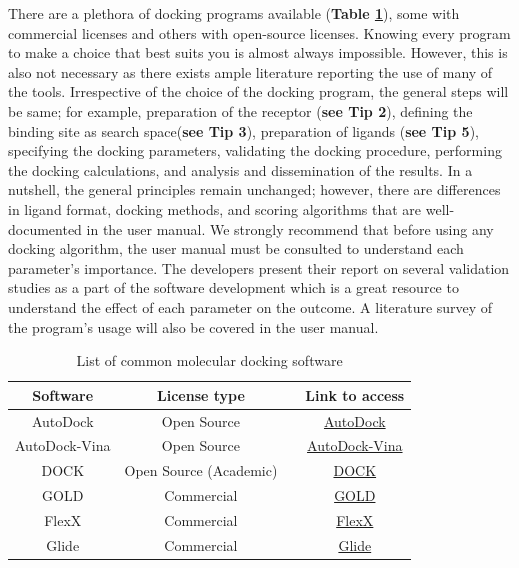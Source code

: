 %
There are a plethora of docking programs available (\textbf{Table \ref{tab:List}}), some with commercial licenses and others with open-source licenses. Knowing every program to make a choice that best suits you is almost always impossible. However, this is also not necessary as there exists ample literature reporting the use of many of the tools. Irrespective of the choice of the docking program, the general steps will be same; for example, preparation of the receptor (\textbf{see  Tip 2}), defining the binding site as search space(\textbf{see Tip 3}), preparation of ligands (\textbf{see Tip 5}), specifying the docking parameters, validating the docking procedure, performing the docking calculations, and analysis and dissemination of the results.  In a nutshell, the general principles remain unchanged; however, there are differences in ligand format, docking methods, and scoring algorithms that are well-documented in the user manual. We strongly recommend that before using any docking algorithm, the user manual must be consulted to understand each parameter's importance. The developers present their report on several validation studies as a part of the software development which is a great resource to understand the effect of each parameter on the outcome. A literature survey of the program's usage will also be covered in the user manual. 

\begin{table}[ht]
    \centering
    \caption{List of common molecular docking software}
    \label{tab:List}
    \begin{tabular}{|c|c|c|c|}
    \hline
         \textbf{Software} & \textbf{License type} & {\color{red}{\textbf{Scoring Function}}} & \textbf{Link to access} \\
    \hline
        AutoDock & Open Source & {\color{red}{Force field}} & \href{https://autodock.scripps.edu/download-autodock4/}{AutoDock}  \\
        AutoDock-Vina & Open Source &{\color{red}{Empirical}} & \href{https://github.com/ccsb-scripps/AutoDock-Vina/releases}{AutoDock-Vina}  \\
        DOCK & Open Source (Academic) & {\color{red}{Force field}}  & \href{https://dock.compbio.ucsf.edu}{DOCK}  \\
        GOLD &  Commercial & {\color{red}{Multiple options}} & \href{https://www.ccdc.cam.ac.uk/solutions/software/gold/}{GOLD} \\
        FlexX &  Commercial & {\color{red}{Empirical}}   & \href{https://www.biosolveit.de/products/#FlexX}{FlexX}  \\
        Glide &  Commercial & {\color{red}{Empirical}}  & \href{https://www.schrodinger.com/platform/products/glide/}{Glide} \\
    \hline
    \end{tabular}
\end{table}

